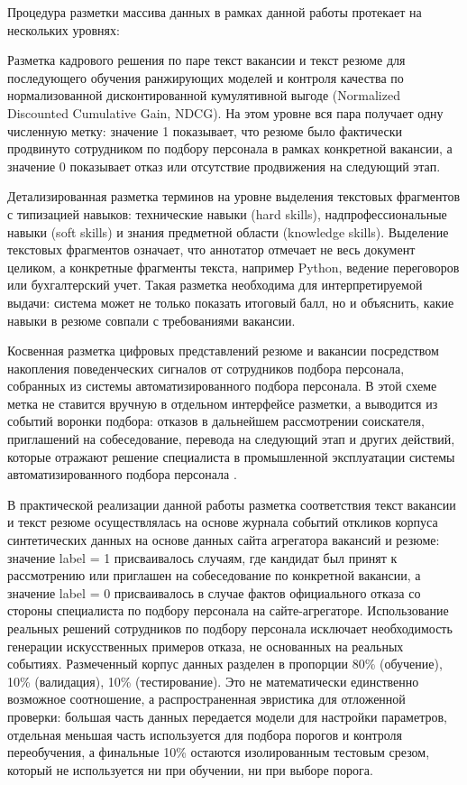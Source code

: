 Процедура разметки массива данных в рамках данной работы протекает на нескольких уровнях:\par
\begin{compactenum}
  \item Разметка кадрового решения по паре текст вакансии и текст резюме для последующего обучения ранжирующих моделей и контроля качества по нормализованной дисконтированной кумулятивной выгоде (Normalized Discounted Cumulative Gain, NDCG). На этом уровне вся пара получает одну численную метку: значение 1 показывает, что резюме было фактически продвинуто сотрудником по подбору персонала в рамках конкретной вакансии, а значение 0 показывает отказ или отсутствие продвижения на следующий этап.
  \item Детализированная разметка терминов на уровне выделения текстовых фрагментов с типизацией навыков: технические навыки (hard skills), надпрофессиональные навыки (soft skills) и знания предметной области (knowledge skills). Выделение текстовых фрагментов означает, что аннотатор отмечает не весь документ целиком, а конкретные фрагменты текста, например Python, ведение переговоров или бухгалтерский учет. Такая разметка необходима для интерпретируемой выдачи: система может не только показать итоговый балл, но и объяснить, какие навыки в резюме совпали с требованиями вакансии.
  \item Косвенная разметка цифровых представлений резюме и вакансии посредством накопления поведенческих сигналов от сотрудников подбора персонала, собранных из системы автоматизированного подбора персонала. В этой схеме метка не ставится вручную в отдельном интерфейсе разметки, а выводится из событий воронки подбора: отказов в дальнейшем рассмотрении соискателя, приглашений на собеседование, перевода на следующий этап и других действий, которые отражают решение специалиста в промышленной эксплуатации системы автоматизированного подбора персонала \cite{src41, src42}.
\end{compactenum}
В практической реализации данной работы разметка соответствия текст вакансии и текст резюме осуществлялась на основе журнала событий откликов корпуса синтетических данных на основе данных сайта агрегатора вакансий и резюме: значение label = 1 присваивалось случаям, где кандидат был принят к рассмотрению или приглашен на собеседование по конкретной вакансии, а значение label = 0 присваивалось в случае фактов официального отказа со стороны специалиста по подбору персонала на сайте-агрегаторе. Использование реальных решений сотрудников по подбору персонала исключает необходимость генерации искусственных примеров отказа, не основанных на реальных событиях. Размеченный корпус данных разделен в пропорции 80\% (обучение), 10\% (валидация), 10\% (тестирование). Это не математически единственно возможное соотношение, а распространенная эвристика для отложенной проверки: большая часть данных передается модели для настройки параметров, отдельная меньшая часть используется для подбора порогов и контроля переобучения, а финальные 10\% остаются изолированным тестовым срезом, который не используется ни при обучении, ни при выборе порога.\par
